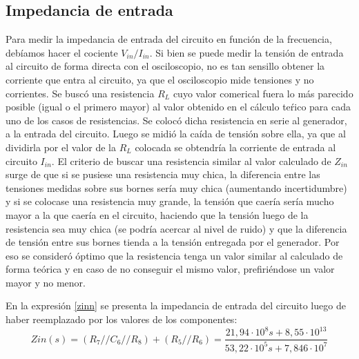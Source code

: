 \subsection{Impedancia de entrada}
Para medir la impedancia de entrada del circuito en funci\'on de la frecuencia, 
deb\'iamos hacer el cociente $V_{in}/I_{in}$. Si bien se puede medir la tensi\'on 
de entrada al circuito de forma directa con el osciloscopio, 
no es tan sensillo obtener la corriente que entra al circuito, ya que el osciloscopio 
mide tensiones y no corrientes. Se busc\'o una resistencia $R_L$ cuyo valor comerical 
fuera lo m\'as parecido posible (igual o el primero mayor) al valor obtenido en 
el c\'alculo te\'rico para cada uno de los casos de resistencias. Se coloc\'o dicha 
resistencia en serie al generador, a la entrada del circuito. Luego se midi\'o la ca\'ida 
de tensi\'on sobre ella, ya que al dividirla por el valor de la $R_L$ colocada se obtendr\'ia 
la corriente de entrada al circuito $I_{in}$. El criterio de buscar una resistencia similar 
al valor calculado de $Z_{in}$ surge de que si se pusiese una resistencia muy chica, 
la diferencia entre las tensiones medidas sobre sus bornes ser\'ia muy chica 
(aumentando incertidumbre) y si se colocase una resistencia muy grande, 
la tensi\'on que caer\'ia ser\'ia mucho mayor a la que caer\'ia en el circuito, 
haciendo que la tensi\'on luego de la resistencia sea muy chica (se podr\'ia 
acercar al nivel de ruido) y que la diferencia de tensi\'on entre sus bornes tienda 
a la tensi\'on entregada por el generador. Por eso se consider\'o \'optimo que la 
resistencia tenga un valor similar al calculado de forma te\'orica y en caso de no 
conseguir el mismo valor, prefiri\'endose un valor mayor y no menor. 

En la expresi\'on \ref{zinn} se presenta la impedancia de entrada del circuito luego de haber reemplazado por los valores de los componentes:
\begin{equation}
Zin(s) =  (R_7 // C_6 // R_8)+(R_5//R_6)=\frac{21,94 \cdot 10^8 s + 8,55 \cdot 10^13}{53,22 \cdot 10^5 s + 7,846 \cdot 10^7}
\label{zinn}
\end{equation}


